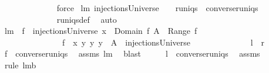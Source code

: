 \begin{isabellebody}
%
\isadelimproof
\ \ \ \ \ \ \ \ \ \ \ \ %
\endisadelimproof
%
\isatagproof
{}\isamarkupfalse%
\ force%
\endisatagproof
{\isafoldproof}%
%
\isadelimproof
\isanewline
%
\endisadelimproof
\isanewline
{}\isamarkupfalse%
\ lm{}{}{\isacharcolon}\ {\isachardoublequoteopen}injectionsUniverse\ \ {\isacharequal}\ \ runiqs\ {\isasyminter}\ converse{\isacharbackquote}runiqs{\isachardoublequoteclose}\ \isanewline
%
\isadelimproof
\ \ \ \ \ \ \ \ \ \ \ \ %
\endisadelimproof
%
\isatagproof
{}\isamarkupfalse%
\ runiqs{\isacharunderscore}def\ \isamarkupfalse%
\ auto%
\endisatagproof
{\isafoldproof}%
%
\isadelimproof
\isanewline
%
\endisadelimproof
\isanewline
{}\isamarkupfalse%
\ lm{}{}{\isacharcolon}\ \ {\isachardoublequoteopen}f\ {\isasymin}\ injectionsUniverse{\isachardoublequoteclose}\ {\isachardoublequoteopen}x\ {\isasymnotin}\ Domain\ f{\isachardoublequoteclose}\ {\isachardoublequoteopen}A\ {\isasyminter}\ {\isacharparenleft}Range\ f{\isacharparenright}\ {\isacharequal}\ {\isacharbraceleft}{\isacharbraceright}{\isachardoublequoteclose}\ \isanewline
\ \ \ \ \ \ \ \ \ \ \ \ \ \ \ {\isachardoublequoteopen}{\isacharbraceleft}f\ {\isasymunion}\ {\isacharbraceleft}{\isacharparenleft}x{\isacharcomma}\ y{\isacharparenright}{\isacharbraceright}{\isacharbar}\ y{\isachardot}\ y\ {\isasymin}\ A{\isacharbraceright}\ {\isasymsubseteq}\ injectionsUniverse{\isachardoublequoteclose}\ \isanewline
\ \ \ \ \ \ \ \ \ \ \ \ {\isacharparenleft}\ {\isachardoublequoteopen}{\isacharquery}l\ {\isasymsubseteq}\ {\isacharquery}r{\isachardoublequoteclose}{\isacharparenright}\ \isanewline
%
\isadelimproof
%
\endisadelimproof
%
\isatagproof
{}\isamarkupfalse%
\ {\isacharminus}\ \ \isanewline
\ \ \isamarkupfalse%
\ {\isachardoublequoteopen}f\ {\isasymin}\ converse{\isacharbackquote}runiqs{\isachardoublequoteclose}\ \isamarkupfalse%
\ assms{\isacharparenleft}{}{\isacharparenright}\ lm{}{}\ \isamarkupfalse%
\ blast\isanewline
\ \ \isamarkupfalse%
\ \isamarkupfalse%
\ {\isachardoublequoteopen}{\isacharquery}l\ {\isasymsubseteq}\ converse{\isacharbackquote}runiqs{\isachardoublequoteclose}\ \isamarkupfalse%
\ assms{\isacharparenleft}{}{\isacharparenright}\ \isamarkupfalse%
\ {\isacharparenleft}rule\ lm{}{}b{\isacharparenright}\isanewline

\end{isabellebody}
